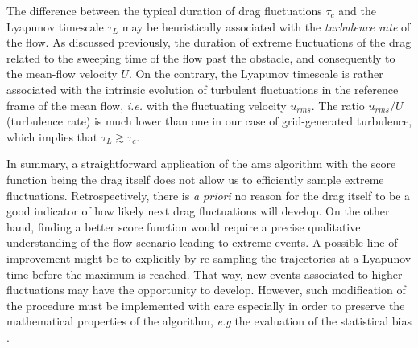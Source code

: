 \documentclass{jfm}
\newcommand{\EL}[1]{{\color{myred}{#1}}}
\begin{document}
The difference between the typical duration of drag fluctuations $\tau_c$ and the Lyapunov timescale $\tau_L$ may be heuristically associated with the \emph{turbulence rate} of the flow.
% 
As discussed previously, the duration of extreme fluctuations of the drag \EL{is closely} related to the sweeping time of the flow past the obstacle, and consequently to the mean-flow velocity $U$. On the contrary, the Lyapunov timescale is rather associated with the intrinsic evolution of turbulent fluctuations in the reference frame of the mean flow, \textit{i.e.} with the fluctuating velocity $u_{rms}$. The ratio $u_{rms}/U$ (turbulence rate) is much lower than one in our case of grid-generated turbulence, which implies that $\tau_L \gtrsim \tau_c$.



% 
In summary, a straightforward application of the \ac{ams} algorithm with the score function being the drag itself does not allow us to efficiently sample extreme fluctuations.
% 
Retrospectively, there is \textit{a priori} no reason for the drag itself to be a good indicator of how likely next drag fluctuations will develop.
On the other hand, finding a better score function would require a precise qualitative understanding of the flow scenario leading to extreme events.
% 
% 
A possible line of improvement might be to explicitly \EL{account for the correlation time of the observable being smaller than the Lyapunov time of the system} by re-sampling the trajectories at a Lyapunov time {before} the maximum is reached. That way, new events associated to higher fluctuations may have the opportunity to develop.
However, such modification of the procedure must be implemented with care especially in order to preserve the mathematical properties of the algorithm, \emph{e.g} the evaluation of the statistical bias .
% 
\end{document}
